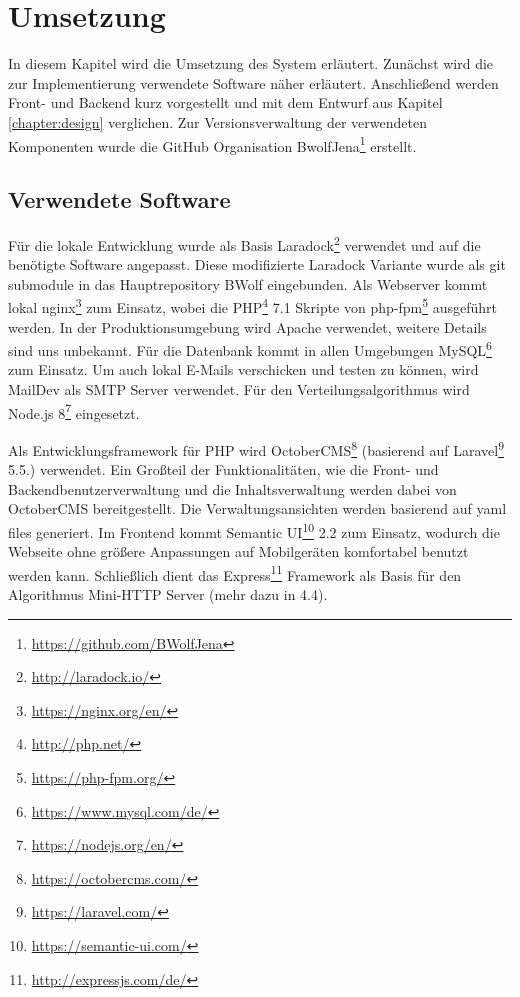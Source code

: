 \chapter{Umsetzung}
\label{chapter:implementation}
    In diesem Kapitel wird die Umsetzung des System erläutert.
    Zunächst wird die zur Implementierung verwendete Software näher erläutert.
    Anschließend werden Front- und Backend kurz vorgestellt und mit dem Entwurf aus Kapitel \ref{chapter:design} verglichen.
    Zur Versionsverwaltung der verwendeten Komponenten wurde die GitHub Organisation BwolfJena\footnote{\href{https://github.com/BWolfJena}{https://github.com/BWolfJena}} erstellt.
    
    \section{Verwendete Software}

        Für die lokale Entwicklung wurde als Basis Laradock\footnote{\href{http://laradock.io/}{http://laradock.io/}} verwendet und auf die benötigte Software angepasst.
        Diese modifizierte Laradock Variante wurde als git submodule in das Hauptrepository BWolf eingebunden.
        Als Webserver kommt lokal nginx\footnote{\href{https://nginx.org/en/}{https://nginx.org/en/}} zum Einsatz, wobei die PHP\footnote{\href{http://php.net/}{http://php.net/}} 7.1 Skripte von php-fpm\footnote{\href{https://php-fpm.org/}{https://php-fpm.org/}} ausgeführt werden.
        In der Produktionsumgebung wird Apache verwendet, weitere Details sind uns unbekannt.
        Für die Datenbank kommt in allen Umgebungen MySQL\footnote{\href{https://www.mysql.com/de/}{https://www.mysql.com/de/}} zum Einsatz.
        Um auch lokal E-Mails verschicken und testen zu können, wird MailDev als SMTP Server verwendet.
        Für den Verteilungsalgorithmus wird Node.js 8\footnote{\href{https://nodejs.org/en/}{https://nodejs.org/en/}} eingesetzt.
        
        Als Entwicklungsframework für PHP wird OctoberCMS\footnote{\href{https://octobercms.com/}{https://octobercms.com/}} (basierend auf Laravel\footnote{\href{https://laravel.com/}{https://laravel.com/}} 5.5.) verwendet. Ein Großteil der Funktionalitäten, wie die Front- und Backendbenutzerverwaltung und die Inhaltsverwaltung werden dabei von OctoberCMS bereitgestellt. Die Verwaltungsansichten werden basierend auf yaml files generiert. Im Frontend kommt Semantic UI\footnote{\href{https://semantic-ui.com/}{https://semantic-ui.com/}} 2.2 zum Einsatz, wodurch die Webseite ohne größere Anpassungen auf Mobilgeräten komfortabel benutzt werden kann. Schließlich
        dient das Express\footnote{\href{http://expressjs.com/de/}{http://expressjs.com/de/}} Framework als Basis für den Algorithmus Mini-HTTP Server (mehr dazu in 4.4).                
